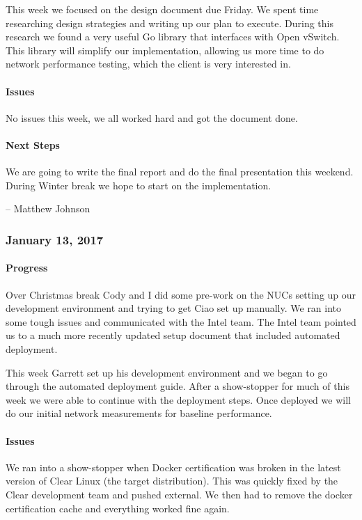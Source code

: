 \documentclass[10pt,onecolumn,journal,draftclsnofoot]{IEEEtran}
\begin{document}
This week we focused on the design document due Friday. We spent time
researching design strategies and writing up our plan to execute. During
this research we found a very useful Go library that interfaces with
Open vSwitch. This library will simplify our implementation, allowing us
more time to do network performance testing, which the client is very
interested in.

\paragraph{Issues} 

No issues this week, we all worked hard and got the document done.

\paragraph{Next Steps} 

We are going to write the final report and do the final presentation
this weekend. During Winter break we hope to start on the
implementation.

-- Matthew Johnson

\subsubsection{January 13, 2017} 

\paragraph{Progress} 

Over Christmas break Cody and I did some pre-work on the NUCs setting up
our development environment and trying to get Ciao set up manually. We
ran into some tough issues and communicated with the Intel team. The
Intel team pointed us to a much more recently updated setup document
that included automated deployment.

This week Garrett set up his development environment and we began to go
through the automated deployment guide. After a show-stopper for much of
this week we were able to continue with the deployment steps. Once
deployed we will do our initial network measurements for baseline
performance.

\paragraph{Issues} 

We ran into a show-stopper when Docker certification was broken in the
latest version of Clear Linux (the target distribution). This was
quickly fixed by the Clear development team and pushed external. We then
had to remove the docker certification cache and everything worked fine
again.
\end{document}
